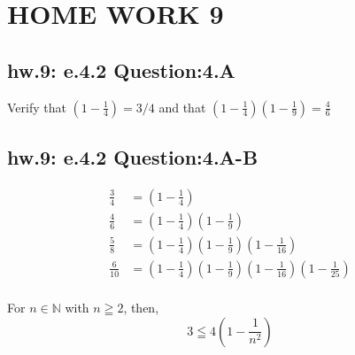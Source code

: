 \newpage
\section{HOME WORK 9}
\subsection{hw.9: e.4.2 Question:4.A}

Verify that $(1 - \frac{1}{4})=3/4$ and that $(1 - \frac{1}{4})(1 - \frac{1}{9}) =\frac{4}{6}$

\subsection{hw.9: e.4.2 Question:4.A-B}

\begin{align*}
    \frac{3}{4} & = (1 - \frac{1}{4}) \\
    \frac{4}{6} & = (1 - \frac{1}{4})(1 - \frac{1}{9}) \\
    \frac{5}{8} & = (1 - \frac{1}{4})(1 - \frac{1}{9})(1 - \frac{1}{16}) \\
    \frac{6}{10} & = (1 - \frac{1}{4})(1 - \frac{1}{9})(1 - \frac{1}{16})(1 - \frac{1}{25}) \\
\end{align*}

\begin{tcolorbox}
    \begin{theorem}
        For $n \in \mathbb{N}$ with $n \geqq 2$, then,
            \begin{equation*}
                 3 \leqq 4(1 - \frac{1}{n^2})
            \end{equation*}
    \end{theorem}
\end{tcolorbox}

